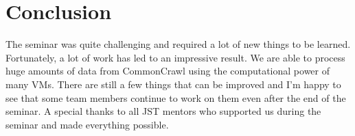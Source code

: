 \documentclass[DIV=calc, paper=a4, fontsize=11pt, twocolumn]{scrartcl}
\begin{document}
\section*{Conclusion}
The seminar was quite challenging and required a lot of new things to be learned.
Fortunately, a lot of work has led to an impressive result. 
We are able to process huge amounts of data from CommonCrawl using the computational power of many VMs.
There are still a few things that can be improved and I'm happy to see that some team members continue to work on them even after the end of the seminar. 
A special thanks to all JST mentors who supported us during the seminar and made everything possible.






%
% 

\end{document}
